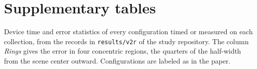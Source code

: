 \documentclass[11pt]{article}
\begin{document}
\section*{Supplementary tables}
Device time and error statistics of every configuration timed or measured on each collection, from the records in
\texttt{results/v2r} of the study repository. The column \emph{Rings} gives the error in four concentric regions, the
quarters of the half-width from the scene center outward. Configurations are labeled as in the paper.

\end{document}
